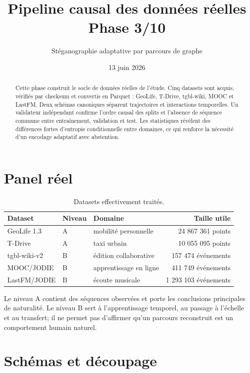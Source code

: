 \documentclass[10pt,a4paper]{article}
\title{Pipeline causal des données réelles\\Phase 3/10}
\author{Stéganographie adaptative par parcours de graphe}
\date{13 juin 2026}
\begin{document}
\maketitle

\begin{abstract}
Cette phase construit le socle de données réelles de l'étude. Cinq datasets
sont acquis, vérifiés par checksum et convertis en Parquet : GeoLife, T-Drive,
tgbl-wiki, MOOC et LastFM. Deux schémas canoniques séparent trajectoires et
interactions temporelles. Un validateur indépendant confirme l'ordre causal
des splits et l'absence de séquence commune entre entraînement, validation et
test. Les statistiques révèlent des différences fortes d'entropie
conditionnelle entre domaines, ce qui renforce la nécessité d'un encodage
adaptatif avec abstention.
\end{abstract}

\section{Panel réel}

\begin{table}[H]
\centering
\caption{Datasets effectivement traités.}
\begin{tabular}{lllr}
\toprule
Dataset & Niveau & Domaine & Taille utile\\
\midrule
GeoLife 1.3 & A & mobilité personnelle & 24 867 361 points\\
T-Drive & A & taxi urbain & 10 055 095 points\\
tgbl-wiki-v2 & B & édition collaborative & 157 474 événements\\
MOOC/JODIE & B & apprentissage en ligne & 411 749 événements\\
LastFM/JODIE & B & écoute musicale & 1 293 103 événements\\
\bottomrule
\end{tabular}
\end{table}

Le niveau A contient des séquences observées et porte les conclusions
principales de naturalité. Le niveau B sert à l'apprentissage temporel, au
passage à l'échelle et au transfert; il ne permet pas d'affirmer qu'un parcours
reconstruit est un comportement humain naturel.

\section{Schémas et découpage}
\end{document}
